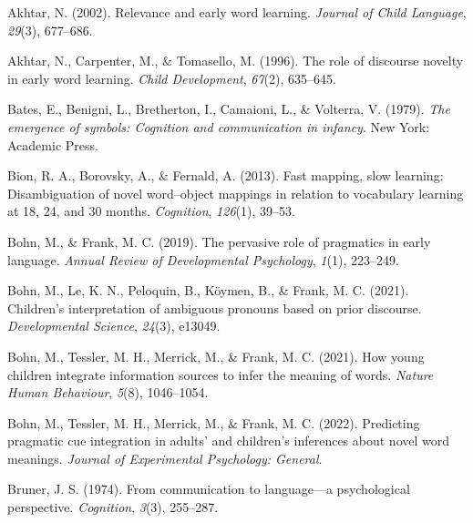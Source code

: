 \documentclass[
  english,
  man,floatsintext]{apa6}
\newlength{\cslhangindent}
\newlength{\cslentryspacingunit} %
\newenvironment{CSLReferences}[2] %
 {%
  \setlength{\parindent}{0pt}
  \ifodd #1
  \let\oldpar\par
  \def\par{\hangindent=\cslhangindent\oldpar}
  \fi
  \setlength{\parskip}{#2\cslentryspacingunit}
 }%
 {}
\begin{document}
\hypertarget{refs}{}
\begin{CSLReferences}{1}{0}
\leavevmode{}%
Akhtar, N. (2002). Relevance and early word learning. \emph{Journal of Child Language}, \emph{29}(3), 677--686.

\leavevmode{}%
Akhtar, N., Carpenter, M., \& Tomasello, M. (1996). The role of discourse novelty in early word learning. \emph{Child Development}, \emph{67}(2), 635--645.

\leavevmode{}%
Bates, E., Benigni, L., Bretherton, I., Camaioni, L., \& Volterra, V. (1979). \emph{The emergence of symbols: Cognition and communication in infancy}. New York: Academic Press.

\leavevmode{}%
Bion, R. A., Borovsky, A., \& Fernald, A. (2013). Fast mapping, slow learning: Disambiguation of novel word--object mappings in relation to vocabulary learning at 18, 24, and 30 months. \emph{Cognition}, \emph{126}(1), 39--53.

\leavevmode{}%
Bohn, M., \& Frank, M. C. (2019). The pervasive role of pragmatics in early language. \emph{Annual Review of Developmental Psychology}, \emph{1}(1), 223--249.

\leavevmode{}%
Bohn, M., Le, K. N., Peloquin, B., Köymen, B., \& Frank, M. C. (2021). Children's interpretation of ambiguous pronouns based on prior discourse. \emph{Developmental Science}, \emph{24}(3), e13049.

\leavevmode{}%
Bohn, M., Tessler, M. H., Merrick, M., \& Frank, M. C. (2021). How young children integrate information sources to infer the meaning of words. \emph{Nature Human Behaviour}, \emph{5}(8), 1046--1054.

\leavevmode{}%
Bohn, M., Tessler, M. H., Merrick, M., \& Frank, M. C. (2022). Predicting pragmatic cue integration in adults' and children's inferences about novel word meanings. \emph{Journal of Experimental Psychology: General}.

\leavevmode{}%
Bruner, J. S. (1974). From communication to language---a psychological perspective. \emph{Cognition}, \emph{3}(3), 255--287.


\end{CSLReferences}
\end{document}
